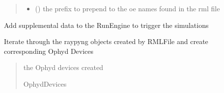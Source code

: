 \documentclass[letterpaper,10pt,english]{sphinxmanual}
\begin{document}
\begin{fulllineitems}
\begin{quote}
\begin{description}
\begin{itemize}
\item {} 
\sphinxAtStartPar
{} () \textendash{} the prefix to prepend to the oe names found in the rml file

\end{itemize}

\end{description}\end{quote}

\begin{fulllineitems}
\label{\detokenize{API:raypyng_bluesky.RaypyngOphydDevices.RaypyngOphydDevices.append_preprocessor}}
\pysigstartsignatures
{}
\pysigstopsignatures
\sphinxAtStartPar
Add supplemental data to the RunEngine to trigger the simulations

\end{fulllineitems}


\begin{fulllineitems}
\label{\detokenize{API:raypyng_bluesky.RaypyngOphydDevices.RaypyngOphydDevices.create_raypyng_elements_from_rml}}
\pysigstartsignatures
{}
\pysigstopsignatures
\sphinxAtStartPar
Iterate through the raypyng objects created by RMLFile and create corresponding Ophyd Devices
\begin{quote}\begin{description}
\sphinxAtStartPar
the Ophyd devices created

\sphinxAtStartPar
OphydDevices

\end{description}\end{quote}

\end{fulllineitems}



\end{fulllineitems}
\end{document}
